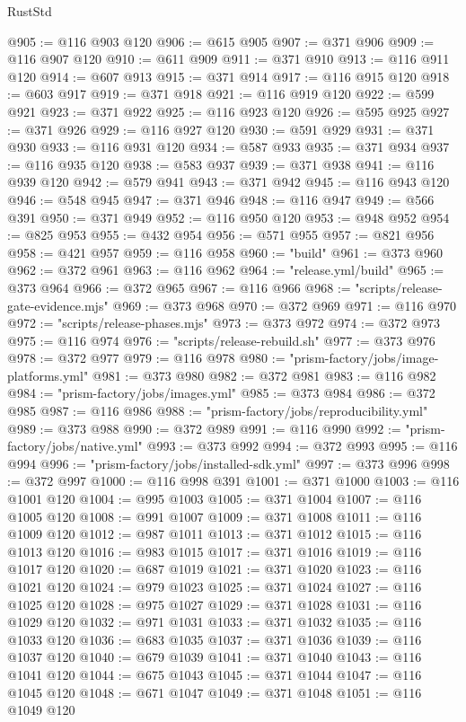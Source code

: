 \begin{lexlean}{RustStd}
\begin{coremodule}
@905 := @116 @903 @120
@906 := @615 @905
@907 := @371 @906
@909 := @116 @907 @120
@910 := @611 @909
@911 := @371 @910
@913 := @116 @911 @120
@914 := @607 @913
@915 := @371 @914
@917 := @116 @915 @120
@918 := @603 @917
@919 := @371 @918
@921 := @116 @919 @120
@922 := @599 @921
@923 := @371 @922
@925 := @116 @923 @120
@926 := @595 @925
@927 := @371 @926
@929 := @116 @927 @120
@930 := @591 @929
@931 := @371 @930
@933 := @116 @931 @120
@934 := @587 @933
@935 := @371 @934
@937 := @116 @935 @120
@938 := @583 @937
@939 := @371 @938
@941 := @116 @939 @120
@942 := @579 @941
@943 := @371 @942
@945 := @116 @943 @120
@946 := @548 @945
@947 := @371 @946
@948 := @116 @947
@949 := @566 @391
@950 := @371 @949
@952 := @116 @950 @120
@953 := @948 @952
@954 := @825 @953
@955 := @432 @954
@956 := @571 @955
@957 := @821 @956
@958 := @421 @957
@959 := @116 @958
@960 := "build"
@961 := @373 @960
@962 := @372 @961
@963 := @116 @962
@964 := "release.yml/build"
@965 := @373 @964
@966 := @372 @965
@967 := @116 @966
@968 := "scripts/release-gate-evidence.mjs"
@969 := @373 @968
@970 := @372 @969
@971 := @116 @970
@972 := "scripts/release-phases.mjs"
@973 := @373 @972
@974 := @372 @973
@975 := @116 @974
@976 := "scripts/release-rebuild.sh"
@977 := @373 @976
@978 := @372 @977
@979 := @116 @978
@980 := "prism-factory/jobs/image-platforms.yml"
@981 := @373 @980
@982 := @372 @981
@983 := @116 @982
@984 := "prism-factory/jobs/images.yml"
@985 := @373 @984
@986 := @372 @985
@987 := @116 @986
@988 := "prism-factory/jobs/reproducibility.yml"
@989 := @373 @988
@990 := @372 @989
@991 := @116 @990
@992 := "prism-factory/jobs/native.yml"
@993 := @373 @992
@994 := @372 @993
@995 := @116 @994
@996 := "prism-factory/jobs/installed-sdk.yml"
@997 := @373 @996
@998 := @372 @997
@1000 := @116 @998 @391
@1001 := @371 @1000
@1003 := @116 @1001 @120
@1004 := @995 @1003
@1005 := @371 @1004
@1007 := @116 @1005 @120
@1008 := @991 @1007
@1009 := @371 @1008
@1011 := @116 @1009 @120
@1012 := @987 @1011
@1013 := @371 @1012
@1015 := @116 @1013 @120
@1016 := @983 @1015
@1017 := @371 @1016
@1019 := @116 @1017 @120
@1020 := @687 @1019
@1021 := @371 @1020
@1023 := @116 @1021 @120
@1024 := @979 @1023
@1025 := @371 @1024
@1027 := @116 @1025 @120
@1028 := @975 @1027
@1029 := @371 @1028
@1031 := @116 @1029 @120
@1032 := @971 @1031
@1033 := @371 @1032
@1035 := @116 @1033 @120
@1036 := @683 @1035
@1037 := @371 @1036
@1039 := @116 @1037 @120
@1040 := @679 @1039
@1041 := @371 @1040
@1043 := @116 @1041 @120
@1044 := @675 @1043
@1045 := @371 @1044
@1047 := @116 @1045 @120
@1048 := @671 @1047
@1049 := @371 @1048
@1051 := @116 @1049 @120

\end{coremodule}
\end{lexlean}
